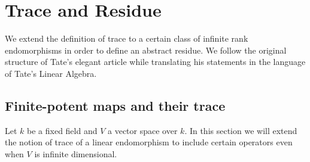 \chapter{Trace and Residue}\label{ch:trace-and-residue}
We extend the definition of trace to a certain class of infinite rank endomorphisms in order to define an abstract residue. We follow the original structure of Tate's elegant article \cite{tate} while translating his statements in the language of Tate's Linear Algebra.
\section{Finite-potent maps and their trace}
Let $k$ be a fixed field and $V$ a vector space over $k$. In this section we will extend the notion of trace of a linear endomorphism to include certain operators even when $V$ is infinite dimensional.
